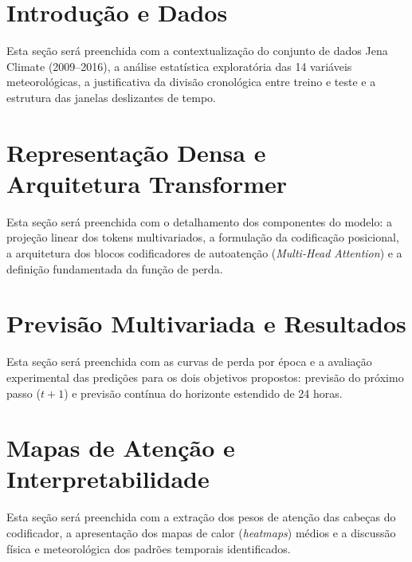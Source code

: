 \documentclass[
	12pt,
	a4paper,
	article,
	twocolumn
]{abntex2}
\begin{document}
\frenchspacing
\SingleSpacing

\maketitle

\begin{abstract}
Este resumo será redigido após a conclusão dos experimentos, sintetizando os principais achados, métricas de previsão e conclusões sobre o mecanismo de atenção em dados climáticos.
\end{abstract}

\section{Introdução e Dados}

Esta seção será preenchida com a contextualização do conjunto de dados Jena Climate (2009--2016), a análise estatística exploratória das 14 variáveis meteorológicas, a justificativa da divisão cronológica entre treino e teste e a estrutura das janelas deslizantes de tempo.

\section{Representação Densa e Arquitetura Transformer}

Esta seção será preenchida com o detalhamento dos componentes do modelo: a projeção linear dos tokens multivariados, a formulação da codificação posicional, a arquitetura dos blocos codificadores de autoatenção (\textit{Multi-Head Attention}) e a definição fundamentada da função de perda.

\section{Previsão Multivariada e Resultados}

Esta seção será preenchida com as curvas de perda por época e a avaliação experimental das predições para os dois objetivos propostos: previsão do próximo passo ($t+1$) e previsão contínua do horizonte estendido de 24 horas.

\section{Mapas de Atenção e Interpretabilidade}

Esta seção será preenchida com a extração dos pesos de atenção das cabeças do codificador, a apresentação dos mapas de calor (\textit{heatmaps}) médios e a discussão física e meteorológica dos padrões temporais identificados.
\end{document}
